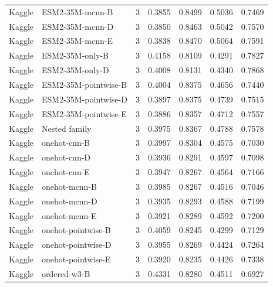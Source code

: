 \begin{longtable}{@{}P{1.35cm}P{5.3cm}rrrrr@{}}
Kaggle & ESM2-\allowbreak{}35M-\allowbreak{}mcnn-\allowbreak{}B & 3 & 0.3855 & 0.8499 & 0.5036 & 0.7469 \\
Kaggle & ESM2-\allowbreak{}35M-\allowbreak{}mcnn-\allowbreak{}D & 3 & 0.3850 & 0.8463 & 0.5042 & 0.7570 \\
Kaggle & ESM2-\allowbreak{}35M-\allowbreak{}mcnn-\allowbreak{}E & 3 & 0.3838 & 0.8470 & 0.5064 & 0.7591 \\
Kaggle & ESM2-\allowbreak{}35M-\allowbreak{}only-\allowbreak{}B & 3 & 0.4158 & 0.8109 & 0.4291 & 0.7827 \\
Kaggle & ESM2-\allowbreak{}35M-\allowbreak{}only-\allowbreak{}D & 3 & 0.4008 & 0.8131 & 0.4340 & 0.7868 \\
Kaggle & ESM2-\allowbreak{}35M-\allowbreak{}pointwise-\allowbreak{}B & 3 & 0.4004 & 0.8375 & 0.4656 & 0.7440 \\
Kaggle & ESM2-\allowbreak{}35M-\allowbreak{}pointwise-\allowbreak{}D & 3 & 0.3897 & 0.8375 & 0.4739 & 0.7515 \\
Kaggle & ESM2-\allowbreak{}35M-\allowbreak{}pointwise-\allowbreak{}E & 3 & 0.3886 & 0.8357 & 0.4712 & 0.7557 \\
Kaggle & Nested family & 3 & 0.3975 & 0.8367 & 0.4788 & 0.7578 \\
Kaggle & onehot-\allowbreak{}cnn-\allowbreak{}B & 3 & 0.3997 & 0.8304 & 0.4575 & 0.7030 \\
Kaggle & onehot-\allowbreak{}cnn-\allowbreak{}D & 3 & 0.3936 & 0.8291 & 0.4597 & 0.7098 \\
Kaggle & onehot-\allowbreak{}cnn-\allowbreak{}E & 3 & 0.3947 & 0.8267 & 0.4564 & 0.7166 \\
Kaggle & onehot-\allowbreak{}mcnn-\allowbreak{}B & 3 & 0.3985 & 0.8267 & 0.4516 & 0.7046 \\
Kaggle & onehot-\allowbreak{}mcnn-\allowbreak{}D & 3 & 0.3935 & 0.8293 & 0.4588 & 0.7199 \\
Kaggle & onehot-\allowbreak{}mcnn-\allowbreak{}E & 3 & 0.3921 & 0.8289 & 0.4592 & 0.7200 \\
Kaggle & onehot-\allowbreak{}pointwise-\allowbreak{}B & 3 & 0.4059 & 0.8245 & 0.4299 & 0.7129 \\
Kaggle & onehot-\allowbreak{}pointwise-\allowbreak{}D & 3 & 0.3955 & 0.8269 & 0.4424 & 0.7264 \\
Kaggle & onehot-\allowbreak{}pointwise-\allowbreak{}E & 3 & 0.3920 & 0.8235 & 0.4426 & 0.7338 \\
Kaggle & ordered-\allowbreak{}w3-\allowbreak{}B & 3 & 0.4331 & 0.8280 & 0.4511 & 0.6927 \\

\end{longtable}
